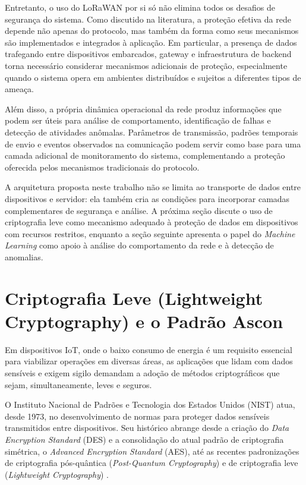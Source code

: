 Entretanto, o uso do LoRaWAN por si só não elimina todos os desafios de segurança do sistema. Como discutido na literatura, a proteção efetiva da rede depende não apenas do protocolo, mas também da forma como seus mecanismos são implementados e integrados à aplicação. Em particular, a presença de dados trafegando entre dispositivos embarcados, gateway e infraestrutura de backend torna necessário considerar mecanismos adicionais de proteção, especialmente quando o sistema opera em ambientes distribuídos e sujeitos a diferentes tipos de ameaça.

Além disso, a própria dinâmica operacional da rede produz informações que podem ser úteis para análise de comportamento, identificação de falhas e detecção de atividades anômalas. Parâmetros de transmissão, padrões temporais de envio e eventos observados na comunicação podem servir como base para uma camada adicional de monitoramento do sistema, complementando a proteção oferecida pelos mecanismos tradicionais do protocolo.

A arquitetura proposta neste trabalho não se limita ao transporte de dados entre dispositivos e servidor: ela também cria as condições para incorporar camadas complementares de segurança e análise. A próxima seção discute o uso de criptografia leve como mecanismo adequado à proteção de dados em dispositivos com recursos restritos, enquanto a seção seguinte apresenta o papel do \textit{Machine Learning} como apoio à análise do comportamento da rede e à detecção de anomalias.


\section{Criptografia Leve (Lightweight Cryptography) e o Padrão Ascon}
Em dispositivos IoT, onde o baixo consumo de energia é um requisito essencial para viabilizar operações em diversas áreas, as aplicações que lidam com dados sensíveis e exigem sigilo demandam a adoção de métodos criptográficos que sejam, simultaneamente, leves e seguros.

O Instituto Nacional de Padrões e Tecnologia dos Estados Unidos (NIST) atua, desde 1973, no desenvolvimento de normas para proteger dados sensíveis transmitidos entre dispositivos. Seu histórico abrange desde a criação do \textit{Data Encryption Standard} (DES) e a consolidação do atual padrão de criptografia simétrica, o \textit{Advanced Encryption Standard} (AES), até as recentes padronizações de criptografia pós-quântica (\textit{Post-Quantum Cryptography}) e de criptografia leve (\textit{Lightweight Cryptography}) \cite{chen2022cornerstone}.

